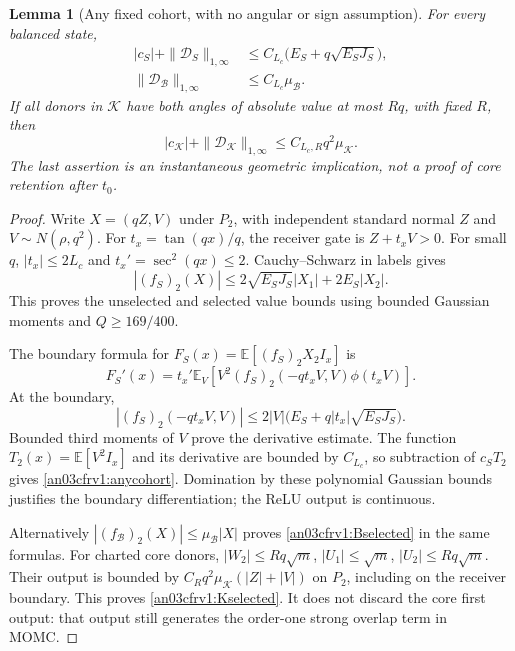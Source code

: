 \documentclass[11pt]{article}
\newtheorem{lemma}[proposition]{Lemma}
\theoremstyle{remark}\newtheorem{remark}[proposition]{Remark}
\newcommand{\E}{\mathbb E}
\newcommand{\KK}{\mathcal K}
\newcommand{\BB}{\mathcal B}
\begin{document}
\begin{lemma}[Any fixed cohort, with no angular or sign assumption]
\label{an03cfrv1:moment}
For every balanced state,
\begin{align}
 |c_S|+\|\mathcal D_S\|_{1,\infty}
 &\le C_{L_c}\big(E_S+q\sqrt{E_SJ_S}\big),\label{an03cfrv1:anycohort}\\
 \|\mathcal D_{\BB}\|_{1,\infty}
 &\le C_{L_c}\mu_{\BB}.\label{an03cfrv1:Bselected}
\end{align}
If all donors in $\KK$ have both angles of absolute value at
most $Rq$, with fixed $R$, then
\begin{equation}
 |c_{\KK}|+\|\mathcal D_{\KK}\|_{1,\infty}
       \le C_{L_c,R}q^2\mu_{\KK}.
 \label{an03cfrv1:Kselected}
\end{equation}
The last assertion is an instantaneous geometric implication,
not a proof of core retention after $t_0$.
\end{lemma}
\begin{proof}
Write $X=(qZ,V)$ under $P_2$, with independent standard normal
$Z$ and $V\sim N(\rho,q^2)$. For
$t_x=\tan(qx)/q$, the receiver gate is $Z+t_xV>0$.
For small $q$, $|t_x|\le2L_c$ and $t_x'=\sec^2(qx)\le2$.
Cauchy--Schwarz in labels gives
\begin{equation}
 |(f_S)_2(X)|
 \le 2\sqrt{E_SJ_S}|X_1|+2E_S|X_2|.
 \label{an03cfrv1:outputbound}
\end{equation}
This proves the unselected and selected value bounds using
bounded Gaussian moments and $Q\ge169/400$.

The boundary formula for
$F_S(x)=\E[(f_S)_2X_2I_x]$ is
\begin{equation}
 F_S'(x)=t_x'\E_V\!\left[
 V^2(f_S)_2(-qt_xV,V)\phi(t_xV)\right].
 \label{an03cfrv1:boundary}
\end{equation}
At the boundary,
\[
 |(f_S)_2(-qt_xV,V)|
 \le2|V|\big(E_S+q|t_x|\sqrt{E_SJ_S}\big).
\]
Bounded third moments of $V$ prove the derivative estimate.
The function $T_2(x)=\E[V^2I_x]$ and its derivative are
bounded by $C_{L_c}$, so subtraction of $c_ST_2$ gives
\eqref{an03cfrv1:anycohort}.
Domination by these polynomial Gaussian bounds justifies
the boundary differentiation; the ReLU output is continuous.

Alternatively $|(f_{\BB})_2(X)|\le\mu_{\BB}|X|$ proves
\eqref{an03cfrv1:Bselected} in the same formulas.
For charted core donors,
$|W_2|\le Rq\sqrt m$, $|U_1|\le\sqrt m$,
$|U_2|\le Rq\sqrt m$.
Their output is bounded by
$C_Rq^2\mu_{\KK}(|Z|+|V|)$ on $P_2$, including on the
receiver boundary. This proves \eqref{an03cfrv1:Kselected}.
It does not discard the core first output: that output
still generates the order-one strong overlap term in MOMC.
\end{proof}
\end{document}
